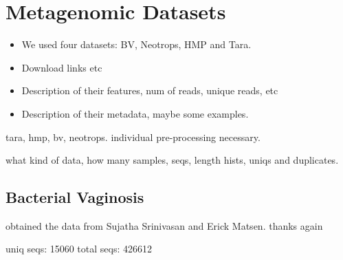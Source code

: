 
\section{Metagenomic Datasets}
\label{sec:MetagenomicDatasets}

\begin{itemize}
    \item We used four datasets: BV, Neotrops, HMP and Tara.
    \item Download links etc
    \item Description of their features, num of reads, unique reads, etc
    \item Description of their metadata, maybe some examples.
\end{itemize}




%
%
%



tara, hmp, bv, neotrops. individual pre-processing necessary.

what kind of data, how many samples, seqs, length hists, uniqs and duplicates.


\subsection{Bacterial Vaginosis}
\label{sec:MetagenomicDatasets:sub:BacterialVaginosis}

obtained the data from Sujatha Srinivasan and Erick Matsen. thanks again

uniq seqs: 15060
total seqs: 426612

